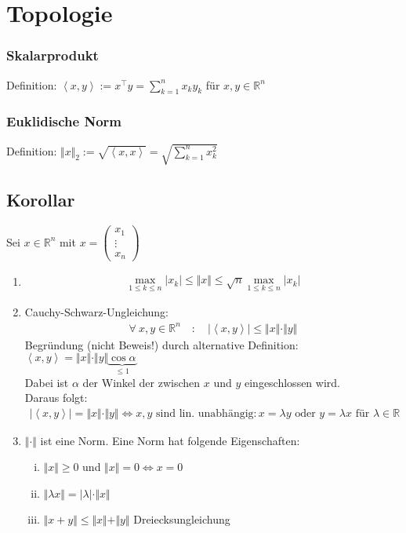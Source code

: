 \documentclass[11pt,a4paper]{book}
\newcommand {\R}	{\mathbb{R}}
\newcommand {\Rn}	{\mathbb{R}^n}
\newcommand{\1}    	{\mathbbm{1}}
\begin{document}
\section{Topologie}

\subsubsection*{Skalarprodukt}
Definition: \( \left< x,y \right> := x^\top y = \sum_{k=1}^n x_k y_k \) für \(x,y \in \Rn\)

\subsubsection*{Euklidische Norm}
Definition: \( \Vert x \Vert_2 := \sqrt{\left< x,x \right>} = \sqrt{\sum_{k=1}^n x_k^2} \)

\subsection{Korollar}
Sei \(x \in \Rn\) mit \(x = \left(\begin{array}{c} x_1 \\ \vdots \\ x_n \end{array}\right)\)
\begin{enumerate}[1.~]
	\item \begin{align*}
		\max_{1 \leqslant k \leqslant n} \vert x_k \vert \leqslant \Vert x \Vert \leqslant \sqrt{n} \max_{1 \leqslant k \leqslant n} \vert x_k \vert
	\end{align*}
	\item Cauchy-Schwarz-Ungleichung:
	\begin{align*}
		\forall~ x,y \in \Rn \quad : \quad \vert \left< x,y \right> \vert \leqslant \Vert x \Vert \cdot \Vert y \Vert
	\end{align*}
	Begründung (nicht Beweis!) durch alternative Definition: \( \left< x,y \right> = \Vert x \Vert \cdot \Vert y \Vert \underbrace{\cos \alpha}_{\leqslant 1} \) \\
	Dabei ist \(\alpha\) der Winkel der zwischen \(x\) und \(y\) eingeschlossen wird. \\
	Daraus folgt:
	\begin{align*}
		\vert \left< x,y \right> \vert = \Vert x \Vert \cdot \Vert y \Vert
		\Leftrightarrow
		x,y \textrm{ sind lin. unabhängig} : x = \lambda y \textrm{ oder } y = \lambda x \textrm{ für } \lambda \in \R
	\end{align*}
	\item \(\Vert \cdot \Vert\) ist eine Norm. Eine Norm hat folgende Eigenschaften:
	\begin{enumerate}[(i)]
		\item \( \Vert x \Vert \geqslant 0 \) und \( \Vert x \Vert = 0 \Leftrightarrow x = 0 \)
		\item \( \Vert \lambda x \Vert = \vert \lambda \vert \cdot \Vert x \Vert  \)
		\item \( \Vert x + y \Vert \leqslant \Vert x \Vert  + \Vert y \Vert \) Dreiecksungleichung
	\end{enumerate}
\end{enumerate}
\end{document}
